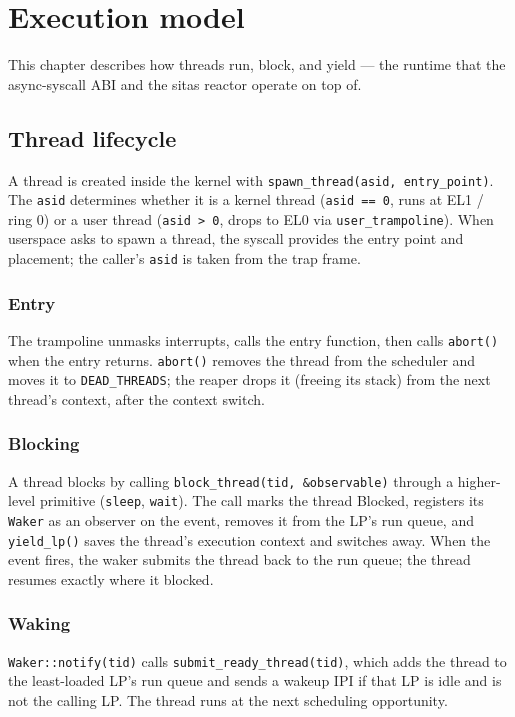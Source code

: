 \chapter{Execution model}

This chapter describes how threads run, block, and yield --- the runtime that
the async-syscall ABI and the sitas reactor operate on top of.

\section{Thread lifecycle}

A thread is created inside the kernel with
\texttt{spawn\_thread(asid, entry\_point)}. The \texttt{asid} determines
whether it is a kernel thread (\texttt{asid == 0}, runs at EL1 / ring 0) or a
user thread (\texttt{asid > 0}, drops to EL0 via \texttt{user\_trampoline}).
When userspace asks to spawn a thread, the syscall provides the entry point and
placement; the caller's \texttt{asid} is taken from the trap frame.

\subsection{Entry} The trampoline unmasks interrupts, calls the entry function,
then calls \texttt{abort()} when the entry returns. \texttt{abort()} removes
the thread from the scheduler and moves it to \texttt{DEAD\_THREADS}; the
reaper drops it (freeing its stack) from the next thread's context, after the
context switch.

\subsection{Blocking} A thread blocks by calling \texttt{block\_thread(tid,
\&observable)} through a higher-level primitive (\texttt{sleep}, \texttt{wait}).
The call marks the thread Blocked, registers its \texttt{Waker} as an observer
on the event, removes it from the LP's run queue, and \texttt{yield\_lp()} saves
the thread's execution context and switches away. When the event fires, the
waker submits the thread back to the run queue; the thread resumes exactly
where it blocked.

\subsection{Waking} \texttt{Waker::notify(tid)} calls
\texttt{submit\_ready\_thread(tid)}, which adds the thread to the least-loaded
LP's run queue and sends a wakeup IPI if that LP is idle and is not the
calling LP. The thread runs at the next scheduling opportunity.

